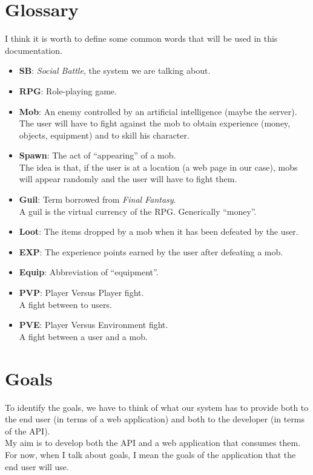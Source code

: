 	\section{Glossary}
	I think it is worth to define some common words that will be used in this documentation.
	\begin{itemize}
		\item \textbf{SB}: \textit{Social Battle}, the system we are talking about.
		\item \textbf{RPG}: Role-playing game.
		\item \textbf{Mob}: An enemy controlled by an artificial intelligence (maybe the server).\\
			The user will have to fight against the mob to obtain experience (money, objects, equipment)
			and to skill his character.
		\item \textbf{Spawn}: The act of ``appearing'' of a mob.\\
			The idea is that, if the user is at a location (a web page in our case), mobs will appear 
			randomly and the user will have to fight them.
		\item \textbf{Guil}: Term borrowed from \textit{Final Fantasy}.\\
			A guil is the virtual currency of the RPG. Generically ``money''.
		\item \textbf{Loot}: The items dropped by a mob when it has been defeated by the user.
		\item \textbf{EXP}: The experience points earned by the user after defeating a mob.
		\item \textbf{Equip}: Abbreviation of ``equipment''.
		\item \textbf{PVP}: Player Versus Player fight.\\
			A fight between to users.
		\item \textbf{PVE}: Player Versus Environment fight.\\
			A fight between a user and a mob.
	\end{itemize}

	\section{Goals}
	To identify the goals, we have to think of what our system has to provide both to the end user 
	(in terms of a web application) and both to the developer (in terms of the API).\\
	My aim is to develop both the API and a web application that consumes them.\\
	For now, when I talk about goals, I mean the goals of the application that the end user will use.


